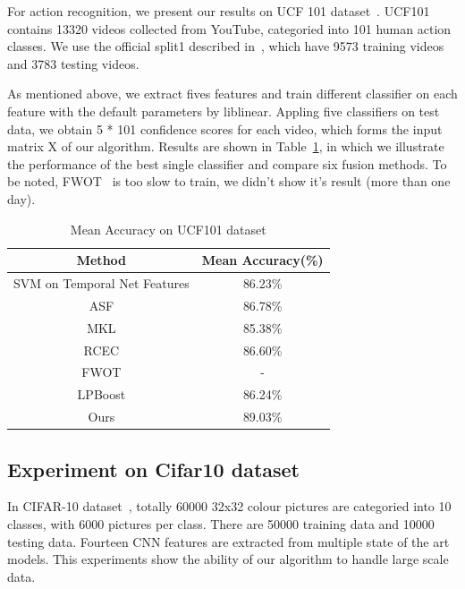 \documentclass[letterpaper]{article}
\begin{document}
For action recognition, we present our results on UCF 101 dataset~\cite{soomro2012ucf101}. 
UCF101 contains 13320 videos collected from YouTube, categoried into 101 human action classes. 
We use the official split1 described in~\cite{soomro2012ucf101}, which have 9573 training videos and 3783 testing videos. 

As mentioned above, we extract fives features and train different classifier on each feature with the default parameters by liblinear. 
Appling five classifiers on test data, we obtain 5 * 101 confidence scores for each video, which forms the input matrix X of our algorithm. 
Results are shown in Table~\ref{table:ucf101}, in which we illustrate the performance of the best single classifier and compare six fusion methods. 
To be noted, FWOT~\cite{xuiccv2013feature} is too slow to train, we didn't show it's result (more than one day).

\begin{table}[h]\small
\centering
\label{table:ucf101}
\begin{tabular}{c|c}
\hline
Method                       & Mean Accuracy(\%) \\\hline
SVM on Temporal Net Features & 86.23\%           \\\hline
ASF                          & 86.78\%           \\
MKL                          & 85.38\%           \\
RCEC                         & 86.60\%           \\          %
FWOT                         & -                 \\
LPBoost                      & 86.24\%           \\\hline
Ours                         & 89.03\%           \\          %
\hline
\end{tabular}
\caption{Mean Accuracy on UCF101 dataset}
\end{table}


\subsection{Experiment on Cifar10 dataset}

In CIFAR-10 dataset~\cite{krizhevsky2009learning}, totally 60000 32x32 colour pictures are categoried into 10 classes, with 6000 pictures per class. 
There are 50000 training data and 10000 testing data. 
Fourteen CNN features are extracted from multiple state of the art models. 
This experiments show the ability of our algorithm to handle large scale data.
\end{document}
